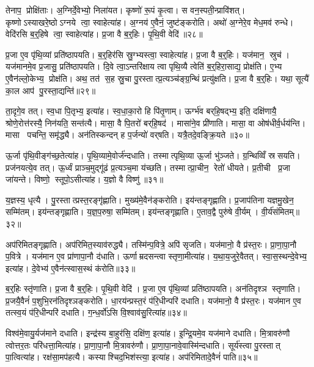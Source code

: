 तेनाप॒ प्रोक्षि॑ताः। अ॒ग्निर्दे॒वेभ्यो॒ निला॑यत। कृष्णो॑ रू॒पं कृ॒त्वा। स वन॒स्पती॒न्प्रावि॑शत्। कृष्णोऽस्याखरे॒ष्ठोऽग्नये त्वा॒ स्वाहेत्या॑ह। अ॒ग्नय॑ ए॒वैनं॒ जुष्ट॑ङ्करोति। अथो॑ अ॒ग्नेरे॒व मेध॒मव॑ रुन्धे। वेदि॑रसि ब॒र्॒हिषे त्वा॒ स्वाहेत्या॑ह। प्र॒जा वै ब॒र्॒हिः। पृ॒थि॒वी वेदि॑॥२८॥

प्र॒जा ए॒व पृ॑थि॒व्यां प्रति॑ष्ठापयति। ब॒र्॒हिर॑सि स्रु॒ग्भ्यस्त्वा॒ स्वाहेत्या॑ह। प्र॒जा वै ब॒र्॒हिः। यज॑मान॒ स्रुच॑। यज॑मानमे॒व प्र॒जासु॒ प्रति॑ष्ठापयति। दि॒वे त्वा॒ऽन्तरि॑क्षाय त्वा पृथि॒व्यै त्वेति॑ ब॒र्॒हिरा॒साद्य॒ प्रोक्ष॑ति। ए॒भ्य ए॒वैन॑ल्लो॒केभ्य॒ प्रोक्ष॑ति। अथ॒ तत॑ स॒ह स्रु॒चा पु॒रस्तात्प्र॒त्यञ्च॑ङ्ग्र॒न्थिं प्रत्यु॑क्षति। प्र॒जा वै ब॒र्॒हिः। यथा॒ सूत्यै॑ का॒ल आप॑ पु॒रस्ता॒द्यन्ति॑॥२९॥

ता॒दृगे॒व तत्। स्व॒धा पि॒तृभ्य॒ इत्या॑ह। स्व॒धा॒का॒रो हि पि॑तृ॒णाम्। ऊर्ग्भ॑व बर्‌हि॒षद्भ्य॒ इति॒ दक्षि॑णायै॒ श्रोणे॒रोत्त॑रस्यै॒ निन॑यति॒ सन्त॑त्यै। मासा॒ वै पि॒तरो॑ बर्‌हि॒षद॑। मासा॑ने॒व प्री॑णाति। मासा॒ वा ओष॑धीर्व॒र्धय॑न्ति। मासा पचन्ति॒ समृ॑द्ध्यै। अन॑तिस्कन्दन् ह प॒र्जन्यो॑ वर्‌षति। यत्रै॒तदे॒वङ्क्रि॒यते॥३०॥

ऊ॒र्जा पृ॑थि॒वीङ्ग॑च्छ॒तेत्या॑ह। पृ॒थि॒व्यामे॒वोर्ज॑न्दधाति। तस्मात्पृथि॒व्या ऊ॒र्जा भु॑ञ्जते। ग्र॒न्थिव्विँ स्रसयति। प्रज॑नयत्ये॒व तत्। ऊ॒र्ध्वं प्राञ्च॒मुद्गू॑ढं प्र॒त्यञ्च॒मा य॑च्छति। तस्मात्प्रा॒चीन॒ रेतो॑ धीयते। प्र॒तीची प्र॒जा जा॑यन्ते। विष्णो॒ स्तूपो॒ऽसीत्या॑ह। य॒ज्ञो वै विष्णु॑॥३१॥

य॒ज्ञस्य॒ धृत्यै। पु॒रस्तात्प्रस्त॒रङ्गृ॑ह्णाति। मुख्य॑मे॒वैन॑ङ्करोति। इय॑न्तङ्गृह्णाति। प्र॒जाप॑तिना यज्ञमु॒खेन॒ सम्मि॑तम्। इय॑न्तङ्गृह्णाति। य॒ज्ञ॒प॒रुषा॒ सम्मि॑तम्। इय॑न्तङ्गृह्णाति। ए॒ताव॒द्वै पुरु॑षे वी॒र्यम्। वी॒र्य॑संमितम्॥३२॥

अप॑रिमितङ्गृह्णाति। अप॑रिमित॒स्याव॑रुद्ध्यै। तस्मि॑न्प॒वित्रे॒ अपि॑ सृजति। यज॑मानो॒ वै प्र॑स्त॒रः। प्रा॒णा॒पा॒नौ प॒वित्रे। यज॑मान ए॒व प्रा॑णापा॒नौ द॑धाति। ऊर्णाम्रदसन्त्वा स्तृणा॒मीत्या॑ह। य॒था॒य॒जुरे॒वैतत्। स्वा॒स॒स्थन्दे॒वेभ्य॒ इत्या॑ह। दे॒वेभ्य॑ ए॒वैन॑त्स्वास॒स्थं क॑रोति॥३३॥

ब॒र्॒हिः स्तृ॑णाति। प्र॒जा वै ब॒र्॒हिः। पृ॒थि॒वी वेदि॑। प्र॒जा ए॒व पृ॑थि॒व्यां प्रति॑ष्ठापयति। अन॑तिदृश्ञ स्तृणाति। प्र॒जयै॒वैनं॑ प॒शुभि॒रन॑तिदृश्ञङ्करोति। धा॒रय॑न्प्रस्त॒रं प॑रि॒धीन्परि॑ दधाति। यज॑मानो॒ वै प्र॑स्त॒रः। यज॑मान ए॒व तत्स्व॒यं प॑रि॒धीन्परि॑ दधाति। ग॒न्ध॒र्वो॑ऽसि वि॒श्वाव॑सु॒रित्या॑ह॥३४॥

विश्व॑मे॒वायु॒र्यज॑माने दधाति। इन्द्र॑स्य बा॒हुर॑सि॒ दक्षि॑ण॒ इत्या॑ह। इ॒न्द्रि॒यमे॒व यज॑माने दधाति। मि॒त्रावरु॑णौ त्वोत्तर॒तः परि॑धत्ता॒मित्या॑ह। प्रा॒णा॒पा॒नौ मि॒त्रावरु॑णौ। प्रा॒णा॒पा॒नावे॒वास्मि॑न्दधाति। सूर्य॑स्त्वा पु॒रस्तात् पा॒त्वित्या॑ह। रक्ष॑सा॒मप॑हत्यै। कस्याश्चिद॒भिश॑स्त्या॒ इत्या॑ह। अप॑रिमितादे॒वैनं॑ पाति॥३५॥

